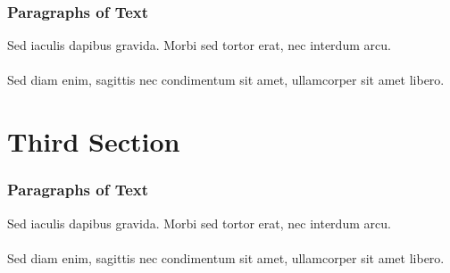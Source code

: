 \documentclass{beamer}
\begin{document}

    \begin{frame}
        \frametitle{Paragraphs of Text}
        Sed iaculis dapibus gravida. Morbi sed tortor erat, nec interdum arcu. \\~\\

        Sed diam enim, sagittis nec condimentum sit amet, ullamcorper sit amet libero.
    \end{frame}

    \section{Third Section}\label{sec:third-section}
    \begin{frame}
        \frametitle{Paragraphs of Text}
        Sed iaculis dapibus gravida. Morbi sed tortor erat, nec interdum arcu. \\~\\

        Sed diam enim, sagittis nec condimentum sit amet, ullamcorper sit amet libero.
    \end{frame}
\end{document}
